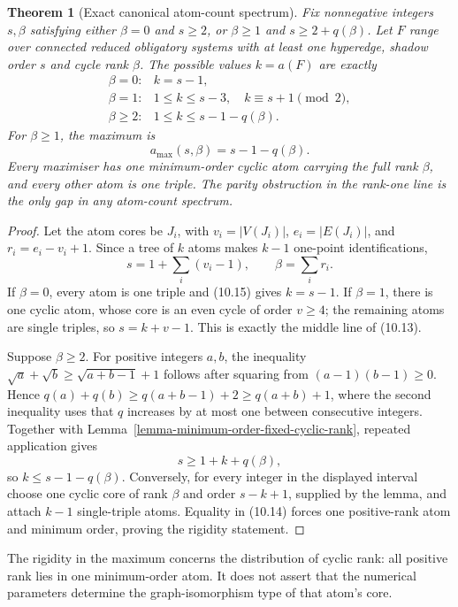 \documentclass[a4paper,11pt,reqno]{amsart}
\theoremstyle{plain}
\newtheorem{theorem}{Theorem}[section]
\theoremstyle{definition}
\theoremstyle{remark}
\begin{document}
\begin{theorem}[Exact canonical atom-count spectrum]
\label{theorem-exact-canonical-atom-count-spectrum}
Fix nonnegative integers $s,\beta$ satisfying either $\beta=0$ and $s\ge2$,
or $\beta\ge1$ and $s\ge2+q(\beta)$.  Let $F$ range over connected reduced
obligatory systems with at least one hyperedge, shadow order $s$ and cycle
rank $\beta$.  The possible values $k=a(F)$ are exactly
\[
\begin{array}{ll}
\beta=0:
  & k=s-1,\\[1mm]
\beta=1:
  & 1\le k\le s-3,\quad k\equiv s+1\pmod 2,\\[1mm]
\beta\ge2:
  & 1\le k\le s-1-q(\beta).
\end{array}
\tag{10.13}
\]
For $\beta\ge1$, the maximum is
\[
a_{\max}(s,\beta)=s-1-q(\beta).
\tag{10.14}
\]
Every maximiser has one minimum-order cyclic atom carrying the full rank
$\beta$, and every other atom is one triple.  The parity obstruction in the
rank-one line is the only gap in any atom-count spectrum.
\end{theorem}
\begin{proof}
Let the atom cores be $J_i$, with $v_i=|V(J_i)|$,
$e_i=|E(J_i)|$, and $r_i=e_i-v_i+1$.  Since a tree of $k$ atoms makes
$k-1$ one-point identifications,
\[
s=1+\sum_i(v_i-1),
\qquad
\beta=\sum_i r_i.
\tag{10.15}
\]
If $\beta=0$, every atom is one triple and (10.15) gives $k=s-1$.
If $\beta=1$, there is one cyclic atom, whose core is an even cycle of order
$v\ge4$; the remaining atoms are single triples, so
$s=k+v-1$.  This is exactly the middle line of (10.13).

Suppose $\beta\ge2$.  For positive integers $a,b$, the inequality
$\sqrt a+\sqrt b\ge\sqrt{a+b-1}+1$ follows after squaring from
$(a-1)(b-1)\ge0$.  Hence
$q(a)+q(b)\ge q(a+b-1)+2\ge q(a+b)+1$, where the second
inequality uses that $q$ increases by at most one between consecutive integers.
Together with Lemma~\ref{lemma-minimum-order-fixed-cyclic-rank}, repeated
application gives
\[
s\ge1+k+q(\beta),
\]
so $k\le s-1-q(\beta)$.  Conversely, for every integer in the displayed
interval choose one cyclic core of rank $\beta$ and order $s-k+1$, supplied by
the lemma, and attach $k-1$ single-triple atoms.  Equality in (10.14) forces
one positive-rank atom and minimum order, proving the rigidity statement.
\end{proof}

The rigidity in the maximum concerns the distribution of cyclic rank:
all positive rank lies in one minimum-order atom.  It does not assert that
the numerical parameters determine the graph-isomorphism type of that
atom's core.
\end{document}
